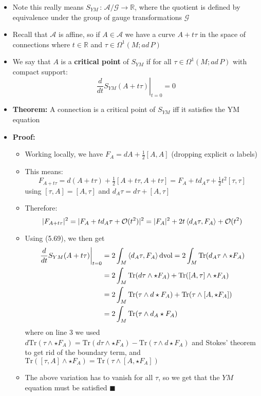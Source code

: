 \documentclass[12pt,a4paper]{article}
\numberwithin{equation}{section}
\begin{document}
\begin{itemize}
\begin{itemize}
		\end{itemize}
		\item Note this really means $S_{YM}\,:\,\mathcal{A}/\mathcal{G}\to \mathbb{R}$, where the quotient is defined by equivalence under the group of gauge transformations $\mathcal{G}$
		\item Recall that $\mathcal{A}$ is affine, so if $A\in\mathcal{A}$ we have a curve $A+t\tau$ in the space of connections where $t\in\mathbb{R}$ and $\tau\in\Omega^{1}(M;ad\,P)$
		\item We say that $A$ is a \textbf{critical point} of $S_{YM}$ if for all $\tau\in\Omega^{1}(M;ad\,P)$ with compact support:
		\begin{equation}
			\left.\frac{d}{dt}S_{YM}(A+t\tau)\right\rvert_{t=0}=0
		\end{equation}
		\item \textbf{Theorem:} A connection is a critical point of $S_{YM}$ iff it satisfies the YM equation
		\item \textbf{Proof:}
		\begin{itemize}
			\item Working locally, we have $F_{A}=dA+\frac{1}{2}[A,A]$ (dropping explicit $\alpha$ labels)
			\item This means:
			$$
			F_{A+t\tau}=d(A+t\tau)+\tfrac{1}{2}[A+t\tau,A+t\tau]=F_{A}+td_{A}\tau+\tfrac{1}{2}t^{2}[\tau,\tau]
			$$
			using $[\tau,A]=[A,\tau]$ and $d_{A}\tau=d\tau+[A,\tau]$
			\item Therefore:
			$$
			|F_{A+t\tau}|^{2}=|F_{A}+td_{A}\tau+\mathcal{O}(t^{2})|^{2}=|F_{A}|^{2}+2t\braket{d_{A}\tau,F_{A}}+\mathcal{O}(t^{2})
			$$
			\item Using (5.69), we then get
			$$
			\begin{aligned}
				\left.\frac{d}{dt}S_{YM}(A+t\tau)\right\rvert_{t=0}&=2\int_{M}\braket{d_{A}\tau,F_{A}}\text{dvol}=2\int_{M}\text{Tr}(d_{A}\tau\wedge\star F_{A})\\&=2\int_{M}\text{Tr}(d\tau\wedge\star F_{A})+\text{Tr}([A,\tau]\wedge\star F_{A})\\&=2\int_{M}\text{Tr}(\tau\wedge d\star F_{A})+\text{Tr}(\tau\wedge [A,\star F_{A}])\\&=2\int_{M}\text{Tr}(\tau\wedge d_{A}\star F_{A})
			\end{aligned}
			$$
			where on line 3 we used $d\text{Tr}(\tau\wedge\star F_{A})=\text{Tr}(d\tau\wedge\star F_{A})-\text{Tr}(\tau\wedge d\star F_{A})$ and Stokes' theorem to get rid of the boundary term, and $\text{Tr}([\tau,A]\wedge\star F_{A})=\text{Tr}(\tau\wedge[A,\star F_{A}])$
			\item The above variation has to vanish for all $\tau$, so we get that the $YM$ equation must be satisfied $\blacksquare$
		\end{itemize}
	\end{itemize}
\end{document}
